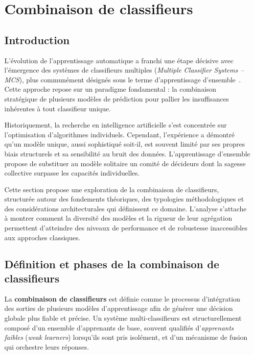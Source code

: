 \section{Combinaison de classifieurs}

\subsection{Introduction}

L'évolution de l'apprentissage automatique a franchi une étape décisive avec l'émergence des
systèmes de classifieurs multiples (\emph{Multiple Classifier Systems -- MCS}), plus communément
désignés sous le terme d'apprentissage d'ensemble~\cite{luisfredgs_mcs_intro,wikip_ensemble_learning,heutte_combi_classif}. Cette approche repose sur un paradigme
fondamental : la combinaison stratégique de plusieurs modèles de prédiction pour pallier les
insuffisances inhérentes à tout classifieur unique.

Historiquement, la recherche en intelligence artificielle s'est concentrée sur l'optimisation
d'algorithmes individuels. Cependant, l'expérience a démontré qu'un modèle unique, aussi sophistiqué soit-il, est souvent limité par ses propres biais structurels et sa sensibilité au bruit des
données. L'apprentissage d'ensemble propose de substituer au modèle solitaire un comité de
décideurs dont la sagesse collective surpasse les capacités individuelles.

Cette section propose une exploration de la combinaison de classifieurs, structurée autour des
fondements théoriques, des typologies méthodologiques et des considérations architecturales
qui définissent ce domaine. L'analyse s'attache à montrer comment la diversité des modèles et la
rigueur de leur agrégation permettent d'atteindre des niveaux de performance et de robustesse
inaccessibles aux approches classiques.

\subsection{Définition et phases de la combinaison de classifieurs}

La \textbf{combinaison de classifieurs} est définie comme le processus d'intégration des sorties de
plusieurs modèles d'apprentissage afin de générer une décision globale plus fiable et précise.
Un système multi-classifieurs est structurellement composé d'un ensemble d'apprenants de
base, souvent qualifiés d'\emph{apprenants faibles} (\emph{weak learners}) lorsqu'ils sont pris isolément,
et d'un mécanisme de fusion qui orchestre leurs réponses.


